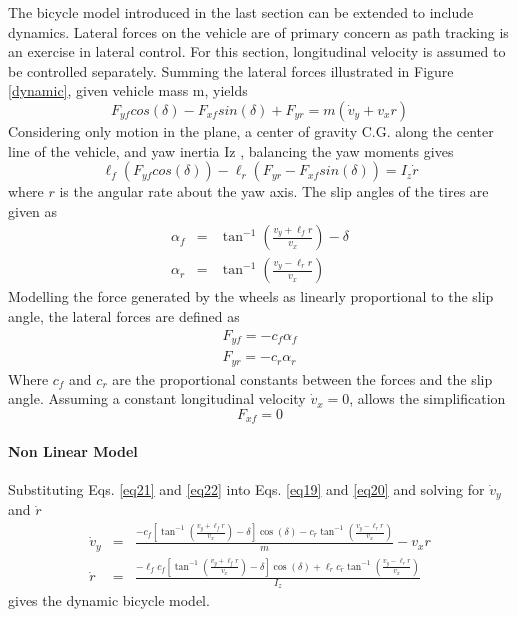 \documentclass{article}
\begin{document}
The bicycle model introduced in the last section can be extended to include dynamics. Lateral forces on the vehicle are of primary concern as path tracking is an exercise in lateral control. For this section, longitudinal velocity is assumed to be controlled separately. Summing the lateral forces illustrated in Figure \ref{dynamic}, given vehicle mass m, yields
\begin{equation}
	F_{yf}cos(\delta) - F_{xf}sin(\delta) + F_{yr} = m(\dot{v}_y + v_xr)
\label{eq19}
\end{equation}
Considering only motion in the plane, a center of gravity C.G. along the center line of the vehicle, and yaw inertia Iz , balancing the yaw moments gives
\begin{equation}
	\ell_f(F_{yf}cos(\delta)) -\ell_r(F_{yr} - F_{xf}sin(\delta)) = I_z\dot{r}
\label{eq20}
\end{equation}
where $r$ is the angular rate about the yaw axis. The slip angles of the tires are given as
\begin{eqnarray}
\alpha_f &=& \tan^{-1}\left( \frac{v_y + \ell_f r}{v_x} \right) -\delta \\
\alpha_r &=& \tan^{-1}\left( \frac{v_y - \ell_r r}{v_x} \right)
\end{eqnarray}
Modelling the force generated by the wheels as linearly proportional to the slip angle, the lateral forces are defined as
\begin{eqnarray}
F_{yf} = - c_f\alpha_f \\
F_{yr} = - c_r\alpha_r
\label{eq21}
\label{forcesyfyr}
\end{eqnarray}
Where $c_f$ and $c_r$ are the proportional constants between the forces and the slip angle. Assuming a constant longitudinal velocity $\dot{v}_x = 0$, allows the simplification
\begin{equation}
	F_{xf} = 0
\label{eq22}
\end{equation}
\paragraph{Non Linear Model}
Substituting Eqs. \ref{eq21} and \ref{eq22} into Eqs. \ref{eq19} and \ref{eq20} and solving for $\dot{v}_y$ and $\dot{r}$
\begin{eqnarray}
	\dot{v}_y &=& \frac{-c_f\left[\tan^{-1}\left(\frac{v_y + \ell_f r}{v_x}\right) - \delta\right]\cos(\delta) - c_r \tan^{-1}\left(\frac{v_y - \ell_rr}{v_x}\right)}{m} - v_xr \\  
	\dot{r} &=& \frac{-\ell_fc_f\left[\tan^{-1}\left(\frac{v_y + \ell_f r}{v_x}\right) - \delta\right]\cos(\delta) + \ell_rc_r \tan^{-1}\left(\frac{v_y - \ell_rr}{v_x}\right)}{I_z} 
\end{eqnarray}
gives the dynamic bicycle model.
\end{document}

